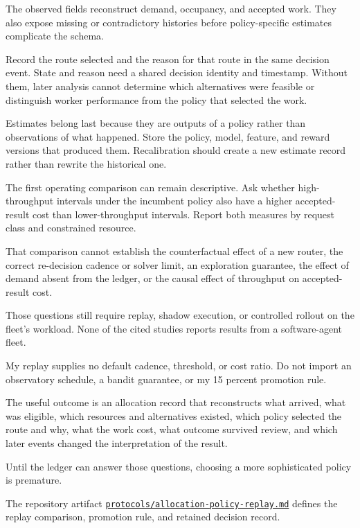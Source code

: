 The observed fields reconstruct demand, occupancy, and accepted work. They also expose missing or contradictory histories before policy-specific estimates complicate the schema.

Record the route selected and the reason for that route in the same decision event. State and reason need a shared decision identity and timestamp. Without them, later analysis cannot determine which alternatives were feasible or distinguish worker performance from the policy that selected the work.

Estimates belong last because they are outputs of a policy rather than observations of what happened. Store the policy, model, feature, and reward versions that produced them. Recalibration should create a new estimate record rather than rewrite the historical one.

The first operating comparison can remain descriptive. Ask whether high-throughput intervals under the incumbent policy also have a higher accepted-result cost than lower-throughput intervals. Report both measures by request class and constrained resource.

That comparison cannot establish the counterfactual effect of a new router, the correct re-decision cadence or solver limit, an exploration guarantee, the effect of demand absent from the ledger, or the causal effect of throughput on accepted-result cost.

Those questions still require replay, shadow execution, or controlled rollout on the fleet's workload. None of the cited studies reports results from a software-agent fleet.

My replay supplies no default cadence, threshold, or cost ratio. Do not import an observatory schedule, a bandit guarantee, or my 15 percent promotion rule.

The useful outcome is an allocation record that reconstructs what arrived, what was eligible, which resources and alternatives existed, which policy selected the route and why, what the work cost, what outcome survived review, and which later events changed the interpretation of the result.

Until the ledger can answer those questions, choosing a more sophisticated policy is premature.

The repository artifact \href{https://github.com/sjarmak/engineering-reliable-coding-agents/blob/main/protocols/allocation-policy-replay.md}{\texttt{protocols/allocation-policy-replay.md}} defines the replay comparison, promotion rule, and retained decision record.


